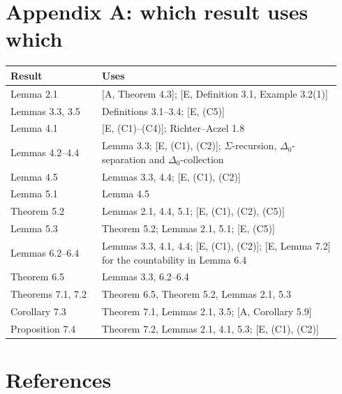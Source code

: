 \documentclass[11pt]{article}
\begin{document}
\section*{Appendix A: which result uses which}

\begin{center}\begin{tabular}{p{0.26\linewidth}p{0.68\linewidth}}
\toprule
Result & Uses \\
\midrule
Lemma 2.1 & [A, Theorem 4.3]; [E, Definition 3.1, Example 3.2(1)] \\
Lemmas 3.3, 3.5 & Definitions 3.1--3.4; [E, (C5)] \\
Lemma 4.1 & [E, (C1)--(C4)]; Richter--Aczel 1.8 \\
Lemmas 4.2--4.4 & Lemma 3.3; [E, (C1), (C2)]; $\Sigma$-recursion, $\Delta_0$-separation and $\Delta_0$-collection \\
Lemma 4.5 & Lemmas 3.3, 4.4; [E, (C1), (C2)] \\
Lemma 5.1 & Lemma 4.5 \\
Theorem 5.2 & Lemmas 2.1, 4.4, 5.1; [E, (C1), (C2), (C5)] \\
Lemma 5.3 & Theorem 5.2; Lemmas 2.1, 5.1; [E, (C5)] \\
Lemmas 6.2--6.4 & Lemmas 3.3, 4.1, 4.4; [E, (C1), (C2)]; [E, Lemma 7.2] for the countability in Lemma 6.4 \\
Theorem 6.5 & Lemmas 3.3, 6.2--6.4 \\
Theorems 7.1, 7.2 & Theorem 6.5, Theorem 5.2, Lemmas 2.1, 5.3 \\
Corollary 7.3 & Theorem 7.1, Lemmas 2.1, 3.5; [A, Corollary 5.9] \\
Proposition 7.4 & Theorem 7.2, Lemmas 2.1, 4.1, 5.3; [E, (C1), (C2)] \\
\bottomrule
\end{tabular}\end{center}

\section*{References}
\end{document}
